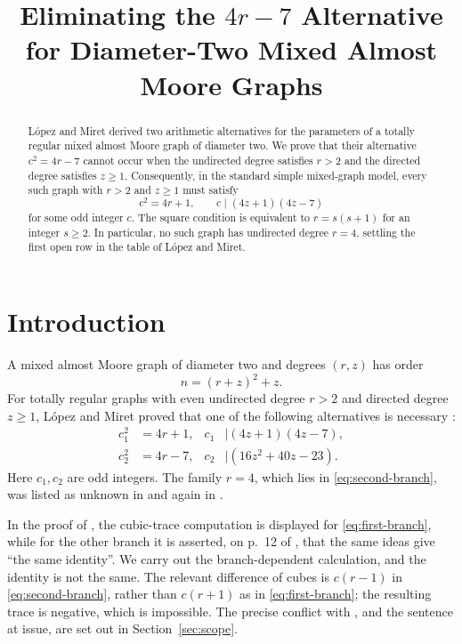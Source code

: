 \documentclass[11pt]{amsart}
\title[Eliminating the $4r-7$ alternative]
{Eliminating the \texorpdfstring{$4r-7$}{4r-7} Alternative for Diameter-Two Mixed Almost Moore Graphs}
\date{}
\begin{document}
\begin{abstract}
L\'opez and Miret derived two arithmetic alternatives for the
parameters of a totally regular mixed almost Moore graph of diameter
two. We prove that their alternative $c^{2}=4r-7$ cannot occur when
the undirected degree satisfies $r>2$ and the directed degree
satisfies $z\geq 1$. Consequently, in the standard simple mixed-graph
model, every such graph with $r>2$ and $z\geq 1$ must satisfy
\[
  c^{2}=4r+1,
  \qquad
  c\mid(4z+1)(4z-7)
\]
for some odd integer $c$. The square condition is equivalent to
$r=s(s+1)$ for an integer $s\geq 2$. In particular, no such graph has
undirected degree $r=4$, settling the first open row in the table of
L\'opez and Miret.
\end{abstract}

\maketitle

\section{Introduction}

A mixed almost Moore graph of diameter two and degrees $(r,z)$ has
order
\[
  n=(r+z)^2+z.
\]
For totally regular graphs with even undirected degree $r>2$ and
directed degree $z\geq 1$, L\'opez and Miret proved that one of the
following alternatives is necessary \cite[Theorem~2]{LM}:
\begin{align}
  c_1^2&=4r+1,
  & c_1&\mid(4z+1)(4z-7), \label{eq:first-branch}\\
  c_2^2&=4r-7,
  & c_2&\mid(16z^2+40z-23). \label{eq:second-branch}
\end{align}
Here $c_1,c_2$ are odd integers. The family $r=4$, which lies in
\eqref{eq:second-branch}, was listed as unknown in
\cite[Table~1]{LM} and again in \cite[Table~1]{DFL}.

In the proof of \cite[Proposition~4]{LM}, the cubic-trace computation
is displayed for \eqref{eq:first-branch}, while for the other branch it
is asserted, on p.~12 of \cite{LM}, that the same ideas give ``the same
identity''. We carry out the branch-dependent calculation, and the
identity is not the same. The relevant difference of cubes is $c(r-1)$
in \eqref{eq:second-branch}, rather than $c(r+1)$ as in
\eqref{eq:first-branch}; the resulting trace is negative, which is
impossible. The precise conflict with \cite{LM}, and the sentence at
issue, are set out in Section~\ref{sec:scope}.
\end{document}
